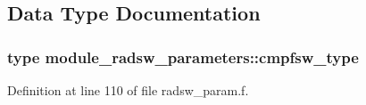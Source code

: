 \subsection{Data Type Documentation}
\label{structmodule__radsw__parameters_1_1cmpfsw__type}
\hypertarget{namespacemodule__radsw__parameters_structmodule__radsw__parameters_1_1cmpfsw__type}{}
\subsubsection{type module\+\_\+radsw\+\_\+parameters\+:\+:cmpfsw\+\_\+type}


Definition at line 110 of file radsw\+\_\+param.\+f.



